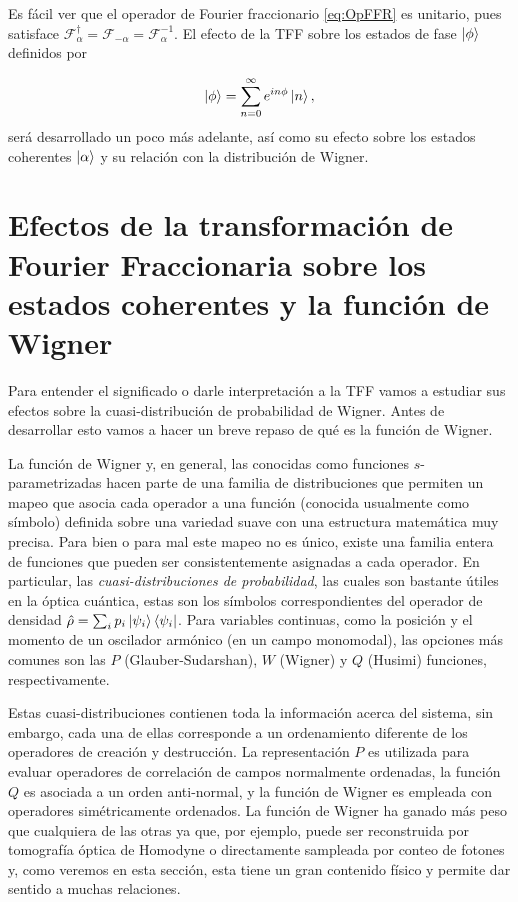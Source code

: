     Es fácil ver que el operador de Fourier fraccionario \ref{eq:OpFFR} es unitario, pues satisface $\mathcal{F}^\dagger_\alpha = \mathcal{F}_{-\alpha} = \mathcal{F}^{-1}_\alpha.$ El efecto de la TFF sobre los estados de fase $\ket{\phi}$ definidos por

    \begin{equation}
        \ket{\phi} = \sum_{n=0}^\infty e^{in\phi}\ket{n},
    \end{equation}
    será desarrollado un poco más adelante, así como su efecto sobre los estados coherentes $\ket{\alpha}$ y su relación con la distribución de Wigner.

\section{Efectos de la transformación de Fourier Fraccionaria sobre los estados coherentes y la función de Wigner}

        Para entender el significado o darle interpretación a la TFF vamos a estudiar sus efectos sobre la cuasi-distribución de probabilidad de Wigner. Antes de desarrollar esto vamos a hacer un breve repaso de qué es la función de Wigner.

        La función de Wigner y, en general, las conocidas como funciones $s$-parametrizadas hacen parte de una familia de distribuciones que permiten un mapeo que asocia cada operador a una función (conocida usualmente como símbolo) definida sobre una variedad suave con una estructura matemática muy precisa. Para bien o para mal este mapeo no es único, existe una familia entera de funciones que pueden ser consistentemente asignadas a cada operador. En particular, las \textit{cuasi-distribuciones de probabilidad}, las cuales son bastante útiles en la óptica cuántica, estas son los símbolos correspondientes del operador de densidad $\hat{\rho}=\sum_i p_i \ket{\psi_i}\bra{\psi_i}$. Para variables continuas, como la posición y el momento de un oscilador armónico (en un campo monomodal), las opciones más comunes son las $P$ (Glauber-Sudarshan), $W$ (Wigner) y $Q$ (Husimi) funciones, respectivamente.

        Estas cuasi-distribuciones contienen toda la información acerca del sistema, sin embargo, cada una de ellas corresponde a un ordenamiento diferente de los operadores de creación y destrucción. La representación $P$ es utilizada para evaluar operadores de correlación de campos normalmente ordenadas, la función $Q$ es asociada a un orden anti-normal, y la función de Wigner es empleada con operadores simétricamente ordenados. La función de Wigner ha ganado más peso que cualquiera de las otras ya que, por ejemplo, puede ser reconstruida por tomografía óptica de Homodyne o directamente sampleada por conteo de fotones y, como veremos en esta sección, esta tiene un gran contenido físico y permite dar sentido a muchas relaciones.

